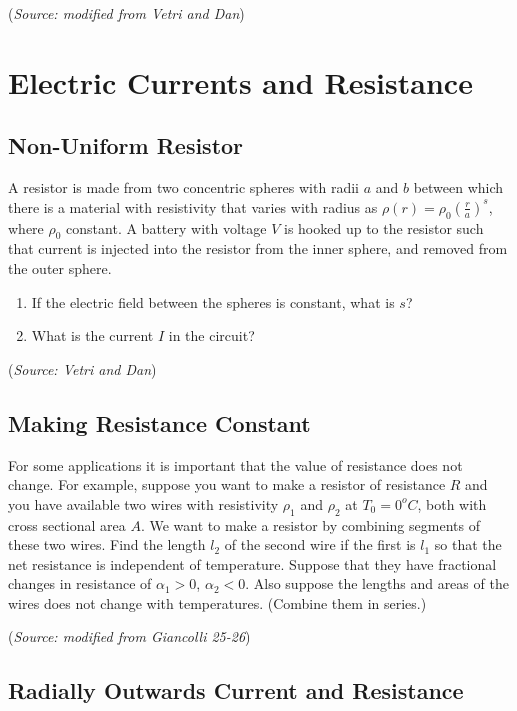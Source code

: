 \documentclass{article}
\begin{document}
(\textit{Source: modified from Vetri and Dan})

\section{Electric Currents and Resistance}

\subsection{Non-Uniform Resistor}

A resistor is made from two concentric spheres with radii $a$ and $b$ between which there is a material with resistivity that varies with radius as $\rho(r) = \rho_0 \left( \frac{r}{a} \right)^s$, where $\rho_0$ constant. A battery with voltage $V$ is hooked up to the resistor such that current is injected into the resistor from the inner sphere, and removed from the outer sphere.
\begin{enumerate}
	\item If the electric field between the spheres is constant, what is $s$?
	\item What is the current $I$ in the circuit?
\end{enumerate}

(\textit{Source: Vetri and Dan})

\subsection{Making Resistance Constant}

For some applications it is important that the value of resistance does not change. For example, suppose you want to make a resistor of resistance $R$ and you have available two wires with resistivity $\rho_1$ and $\rho_2$ at $T_0=0 ^o C$, both with cross sectional area $A$. We want to make a resistor by combining segments of these two wires. Find the length $l_2$ of the second wire if the first is $l_1$ so that the net resistance is independent of temperature. Suppose that they have fractional changes in resistance of $\alpha_1> 0$, $\alpha_2 < 0$. Also suppose the lengths and areas of the wires does not change with temperatures. (Combine them in series.)
 
(\textit{Source: modified from Giancolli 25-26})

\subsection{Radially Outwards Current and Resistance}
\end{document}
